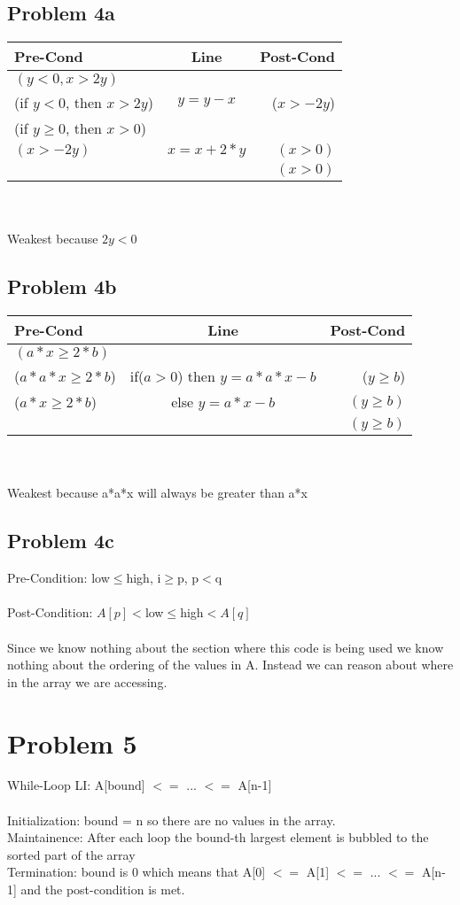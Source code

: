 \documentclass{article}
\begin{document}
\subsection*{Problem 4a}
\begin{tabular}{| l | c | r |}
\hline
Pre-Cond & Line & Post-Cond \\ \hline
$(y<0, x>2y)$ & & \\ \hline
(if $y<0$, then $x>2y$) & $y = y - x$ & ($x>-2y$) \\
(if $y\geq0$, then $x>0$) & & \\ \hline
$(x>-2y)$ & $x = x + 2 * y$ & $(x>0)$ \\ \hline
& & $(x > 0)$ \\ \hline
\end{tabular} \\ \\

Weakest because $2y < 0$

\subsection*{Problem 4b}
\begin{tabular}{| l | c | r |}
\hline
Pre-Cond & Line & Post-Cond \\ \hline
$(a*x \geq 2*b)$ & & \\ \hline
($a*a*x \geq 2*b$) & if($a>0$) then $y=a*a*x-b$ & ($y\geq b$) \\ \hline
($a*x \geq 2*b$) & else $y=a*x-b$ & $(y\geq b)$ \\ \hline
& & $(y\geq b)$ \\ \hline
\end{tabular} \\ \\
Weakest because a*a*x will always be greater than a*x

\subsection*{Problem 4c}
Pre-Condition: low$\leq$high, i$\geq$p, p$<$q \\ \\
Post-Condition: $A[p]<$low$\leq$high$<A[q]$ \\ \\
Since we know nothing about the section where this code is being used we know nothing about the ordering of the values in A. Instead we can reason about where in the array we are accessing.

\section*{Problem 5}
While-Loop LI: A[bound] $<=$ ... $<=$ A[n-1] \\ \\

Initialization: bound = n so there are no values in the array. \\
Maintainence: After each loop the bound-th largest element is bubbled to the sorted part of the array \\
Termination: bound is 0 which means that A[0] $<=$ A[1] $<=$ ... $<=$ A[n-1] and the post-condition is met. \\
\end{document}
